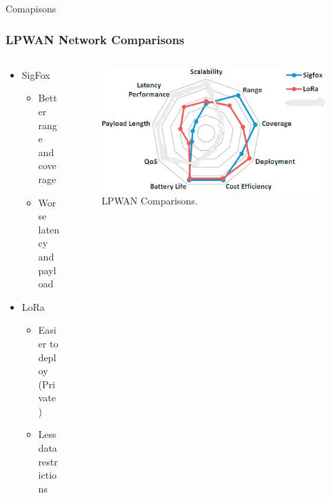 \documentclass{beamer}
\begin{document}
\begin{frame}{Comapisons}
  \frametitle{LPWAN Network Comparisons}
  \begin{columns}
    \begin{column}{0.5\textwidth}
      \begin{itemize}
        \item SigFox
        \begin{itemize}
          \item Better range and coverage
          \item Worse latency and payload
        \end{itemize}
        \item LoRa
        \begin{itemize}
          \item Easier to deploy (Private)
          \item Less data restrictions
        \end{itemize}
      \end{itemize}
    \end{column}
    \begin{column}{0.5\textwidth}
      \begin{figure}[htbp]
        \centering
        \includegraphics[width=\textwidth]{LPWAN_comparisons.png}
        \caption{LPWAN Comparisons.\cite{mekki2019comparative}}
        \label{fig:LPWAN_Comparisons_map}
      \end{figure}
    \end{column}
  \end{columns}
\end{frame}
\end{document}
